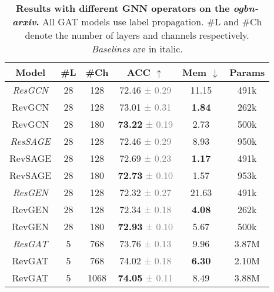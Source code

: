 \documentclass{article}
\begin{document}
\begin{table}[t]
\vspace{-8pt}
\centering
\setlength{\tabcolsep}{5pt}
\caption{\textbf{Results with different GNN operators on the \emph{ogbn-arxiv}.} All GAT models use label propagation. \#L and \#Ch denote the number of layers and channels respectively. \textit{Baselines} are in italic.}
\vspace{2pt}
\begin{tabular}{cccccc}
\toprule
  \label{table:ogbn_arxiv_ablation}
  \centering
Model & \#L & \#Ch & ACC $\uparrow$ & Mem $\downarrow$ & Params \\
\midrule
\textit{ResGCN} & 28 & 128 & 72.46 \textcolor{gray}{\small{± 0.29}} & 11.15
& 491k \\
RevGCN & 28 & 128 & 73.01 \textcolor{gray}{\small{± 0.31}} & \textbf{1.84}
& 262k \\
RevGCN & 28 & 180 & \textbf{73.22} \textcolor{gray}{\small{± 0.19}} & 2.73
& 500k \\
\midrule
\textit{ResSAGE} & 28 & 128 & 72.46 \textcolor{gray}{\small{± 0.29}} & 8.93
& 950k \\
RevSAGE & 28 & 128 & 72.69 \textcolor{gray}{\small{± 0.23}} & \textbf{1.17}
& 491k \\
RevSAGE & 28 & 180 & \textbf{72.73} \textcolor{gray}{\small{± 0.10}} & 1.57 
& 953k \\
\midrule
\textit{ResGEN} & 28 & 128 & 72.32 \textcolor{gray}{\small{± 0.27}} & 21.63 
& 491k \\
RevGEN & 28 & 128 & 72.34 \textcolor{gray}{\small{± 0.18}} & \textbf{4.08} 
& 262k \\
RevGEN & 28 & 180 & \textbf{72.93} \textcolor{gray}{\small{± 0.10}} & 5.67
& 500k \\
\midrule
\textit{ResGAT} & 5 & 768 & 73.76 \textcolor{gray}{\small{± 0.13}} & 9.96
& 3.87M \\
RevGAT & 5 & 768 & 74.02 \textcolor{gray}{\small{± 0.18}} & \textbf{6.30}
& 2.10M \\
RevGAT & 5 & 1068 & \textbf{74.05} \textcolor{gray}{\small{± 0.11}} & 8.49
& 3.88M \\
\bottomrule
\end{tabular}
\end{table}
\end{document}
